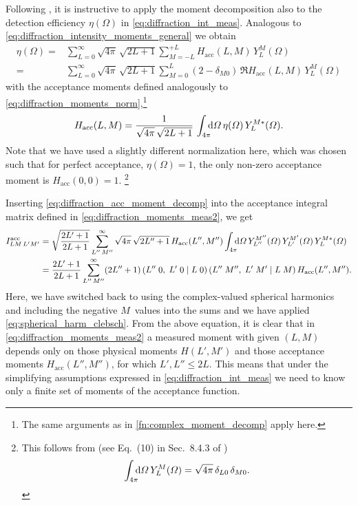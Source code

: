 Following , it is instructive to apply the
moment decomposition also to the detection efficiency $\eta(\Omega)$
in \cref{eq:diffraction_int_meas}.  Analogous to
\cref{eq:diffraction_intensity_moments_general} we obtain
\begin{align}
  \label{eq:diffraction_acc_moment_decomp}
  \eta(\Omega)
  ={}& \sum_{L = 0}^\infty \sqrt{4 \pi}\, \sqrt{2 L + 1} \sum_{M = -L}^{+L} H_\text{acc}(L, M)\, Y_L^M(\Omega)
  \\
  ={}& \sum_{L = 0}^\infty \sqrt{4 \pi}\, \sqrt{2 L + 1} \sum_{M = 0}^{L} (2 - \delta_{M 0})\, \Re{H_\text{acc}(L, M)\, Y_L^M(\Omega)}
\end{align}
with the acceptance moments defined analogously to
\cref{eq:diffraction_moments_norm},\footnote{The same arguments as in
\cref{fn:complex_moment_decomp} apply here.} \ie
\begin{equation}
  \label{eq:diffraction_acc_moment}
  H_\text{acc}(L, M)
  = \frac{1}{\sqrt{4 \pi}\, \sqrt{2 L + 1}}\, \int_{4 \pi}\!\!\! \dif{\Omega}\, \eta(\Omega)\, Y_L^{M *}(\Omega).
\end{equation}
Note that we have used a slightly different normalization here, which
was chosen such that for perfect acceptance, \ie $\eta(\Omega) = 1$,
the only non-zero acceptance moment is $H_\text{acc}(0, 0) = 1$.%
\footnote{%
  This follows from (see Eq.~(10) in Sec.~8.4.3 of
  )
  \begin{equation}
    \int_{4 \pi}\!\!\! \dif{\Omega}\, Y_L^M(\Omega)
    = \sqrt{4 \pi}\, \delta_{L 0}\, \delta_{M 0}.
  \end{equation}
}

Inserting \cref{eq:diffraction_acc_moment_decomp} into the acceptance
integral matrix defined in \cref{eq:diffraction_moments_meas2}, we get
\begin{align}
  I^\text{acc}_{L M\, L' M'}
  ={}& \sqrt{\frac{2 L' + 1}{2 L + 1}} \sum_{L''\, M''}^\infty \sqrt{4 \pi}\, \sqrt{2 L'' + 1}\, H_\text{acc}(L'', M'')
  \int_{4 \pi}\!\!\! \dif{\Omega}\, Y_{L''}^{M''}(\Omega)\, Y_{L'}^{M'}(\Omega)\, Y_L^{M *}(\Omega) \notag
  \\
  \label{eq:diffraction_acc_int_moment_decomp}
  ={}& \frac{2 L' + 1}{2 L + 1} \sum_{L''\, M''}^\infty (2 L'' + 1)\,
  \clebsch{L''}{0}{L'}{0}{L}{0}\, \clebsch{L''}{M''}{L'}{M'}{L}{M}\, H_\text{acc}(L'', M'').
\end{align}
Here, we have switched back to using the complex-valued spherical
harmonics and including the negative $M$~values into the sums and we
have applied \cref{eq:spherical_harm_clebsch}.  From the above
equation, it is clear that in \cref{eq:diffraction_moments_meas2} a
measured moment with given $(L, M)$ depends only on those physical
moments $H(L', M')$ and those acceptance moments $H_\text{acc}(L'',
M'')$, for which $L', L'' \leq 2 L$.  This means that under the
simplifying assumptions expressed in \cref{eq:diffraction_int_meas} we
need to know only a finite set of moments of the acceptance function.

